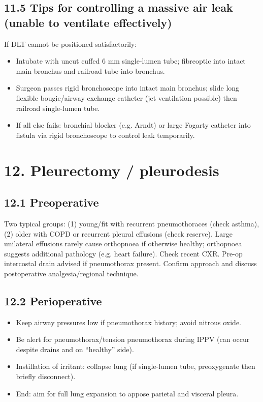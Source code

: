 \documentclass[11pt,a4paper]{article}
\begin{document}
\subsection{11.5 Tips for controlling a massive air leak (unable to ventilate effectively)}
If DLT cannot be positioned satisfactorily:
\begin{itemize}[leftmargin=*, itemsep=2pt]
  \item Intubate with uncut cuffed 6 mm single-lumen tube; fibreoptic into intact main bronchus and railroad tube into bronchus.
  \item Surgeon passes rigid bronchoscope into intact main bronchus; slide long flexible bougie/airway exchange catheter (jet ventilation possible) then railroad single-lumen tube.
  \item If all else fails: bronchial blocker (e.g. Arndt) or large Fogarty catheter into fistula via rigid bronchoscope to control leak temporarily.
\end{itemize}

\section{12. Pleurectomy / pleurodesis}

\subsection{12.1 Preoperative}
Two typical groups: (1) young/fit with recurrent pneumothoraces (check asthma), (2) older with COPD or recurrent pleural effusions (check reserve). Large unilateral effusions rarely cause orthopnoea if otherwise healthy; orthopnoea suggests additional pathology (e.g. heart failure). Check recent CXR. Pre-op intercostal drain advised if pneumothorax present. Confirm approach and discuss postoperative analgesia/regional technique.

\subsection{12.2 Perioperative}
\begin{itemize}[leftmargin=*, itemsep=2pt]
  \item Keep airway pressures low if pneumothorax history; avoid nitrous oxide.
  \item Be alert for pneumothorax/tension pneumothorax during IPPV (can occur despite drains and on ``healthy'' side).
  \item Instillation of irritant: collapse lung (if single-lumen tube, preoxygenate then briefly disconnect).
  \item End: aim for full lung expansion to appose parietal and visceral pleura.
\end{itemize}
\end{document}
